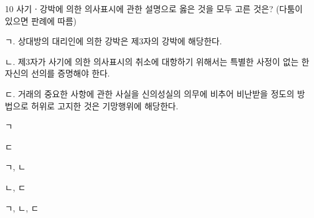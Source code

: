 \begin{question}{10}
사기ㆍ강박에 의한 의사표시에 관한 설명으로 옳은 것을 모두 고른 것은? (다툼이 있으면 판례에 따름)
\begin{framedtext}
ㄱ. 상대방의 대리인에 의한 강박은 제3자의 강박에 해당한다. \par
ㄴ. 제3자가 사기에 의한 의사표시의 취소에 대항하기 위해서는 특별한 사정이 없는 한 자신의 선의를 증명해야 한다. \par
ㄷ. 거래의 중요한 사항에 관한 사실을 신의성실의 의무에 비추어 비난받을 정도의 방법으로 허위로 고지한 것은 기망행위에 해당한다.
\end{framedtext}
\begin{choices}
  \item ㄱ
  \item ㄷ
  \item ㄱ, ㄴ
  \item ㄴ, ㄷ
  \item ㄱ, ㄴ, ㄷ
\end{choices}
\end{question}
